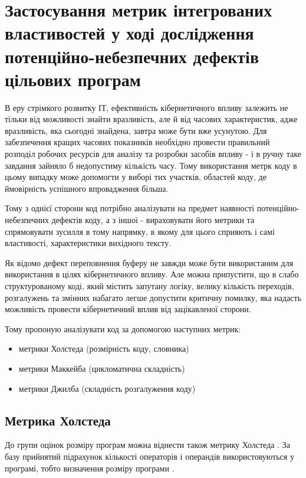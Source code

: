 \section{Застосування метрик інтегрованих властивостей у ході дослідження потенційно-небезпечних дефектів цільових програм}
\label{2section:id8}
В еру стрімкого розвитку ІТ, ефективність кібернетичного впливу залежить не тільки від можливості знайти вразливість, але й від часових характеристик, адже вразливість, яка сьогодні знайдена, завтра може бути вже усунутою. Для забезпечення кращих часових показників необхідно провести правильний розподіл робочих ресурсів для аналізу та розробки засобів впливу - і в ручну таке завдання зайняло б недопустиму кількість часу. Тому використання метрк коду в цьому випадку може допомогти у виборі тих участків, областей коду, де ймовірність успішного впровадження більша.

Тому з однієї сторони код потрібно аналізувати на предмет наявності потенційно-небезпечних дефектів коду, а з іншої - вираховувати його метрики та спрямовувати зусилля в тому напрямку, в якому для цього сприяють і самі властивості, характеристики вихідного тексту.

Як відомо дефект переповнення буферу не завжди може бути використаним для використання в цілях кібернетичного впливу.
Але можна припустити, що в слабо структурованому коді, який містить запутану логіку, велику кількість переходів, розгалужень та змінних набагато легше допустити критичну помилку, яка надасть можливість провести кібернетичний вплив від зацікавленої сторони.

Тому пропоную аналізувати код за допомогою наступних метрик: \begin{itemize}
\item {} 
метрики Холстеда (розмірність коду, словника)

\item {} 
метрики Маккейба (цикломатична складність)

\item {} 
метрики Джилба (складність розгалуження коду)

\end{itemize}

\subsection{Метрика Холстеда}
\label{2section:id10}
До групи оцінок розміру програм можна віднести також метрику Холстеда . За базу прийнятий підрахунок кількості операторів і операндів використовуються у програмі, тобто визначення розміру програми .

